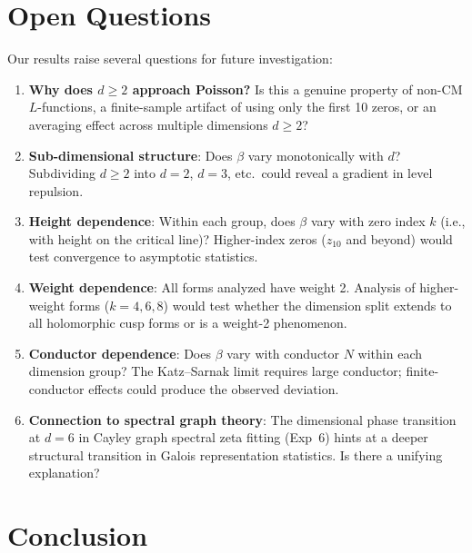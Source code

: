 \documentclass[11pt]{article}
\begin{document}
\section{Open Questions}
\label{sec:questions}

Our results raise several questions for future investigation:

\begin{enumerate}
  \item \textbf{Why does $d\ge2$ approach Poisson?}  Is this a genuine
    property of non-CM $L$-functions, a finite-sample artifact of
    using only the first 10 zeros, or an averaging effect across
    multiple dimensions $d\ge2$?
  \item \textbf{Sub-dimensional structure}: Does $\beta$ vary
    monotonically with $d$?  Subdividing $d\ge2$ into $d=2$, $d=3$,
    etc.\ could reveal a gradient in level repulsion.
  \item \textbf{Height dependence}: Within each group, does $\beta$
    vary with zero index $k$ (i.e., with height on the critical line)?
    Higher-index zeros ($z_{10}$ and beyond) would test convergence
    to asymptotic statistics.
  \item \textbf{Weight dependence}: All forms analyzed have weight 2.
    Analysis of higher-weight forms ($k=4,6,8$) would test whether the
    dimension split extends to all holomorphic cusp forms or is a
    weight-2 phenomenon.
  \item \textbf{Conductor dependence}: Does $\beta$ vary with
    conductor $N$ within each dimension group?  The Katz--Sarnak
    limit requires large conductor; finite-conductor effects could
    produce the observed deviation.
  \item \textbf{Connection to spectral graph theory}: The dimensional
    phase transition at $d=6$ in Cayley graph spectral zeta fitting
    (Exp~6) hints at a deeper structural transition in Galois
    representation statistics.  Is there a unifying explanation?
\end{enumerate}

\section{Conclusion}
\label{sec:conclusion}
\end{document}
